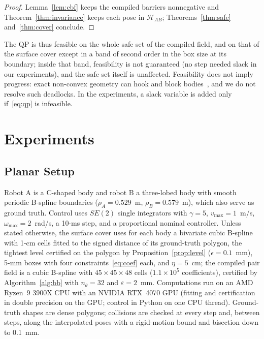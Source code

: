 \documentclass[journal]{IEEEtran}
\theoremstyle{definition}
\begin{document}
\begin{proof}
Lemma~\ref{lem:cbf} keeps the compiled barriers nonnegative and Theorem~\ref{thm:invariance} keeps each
pose in $\mathcal H_{AB}$; Theorems~\ref{thm:safe} and~\ref{thm:cover} conclude.
\end{proof}
The QP is thus feasible on the whole safe set of the compiled field, and on that of the surface cover
except in a band of second order in the box size at its boundary; inside that band, feasibility is not
guaranteed (no step needed slack in our experiments), and the safe set itself is unaffected.
Feasibility does not imply progress: exact non-convex geometry can hook and block
bodies~\cite{reis2020undesirable}, and we do not resolve such deadlocks. In the experiments, a slack
variable is added only if~\eqref{eq:qp} is infeasible.

\section{Experiments}\label{sec:exp}

\subsection{Planar Setup}
Robot A is a C-shaped body and robot B a three-lobed body with smooth periodic B-spline boundaries
($\rho_A=0.529$~m, $\rho_B=0.579$~m), which also serve as ground truth. Control uses $SE(2)$ single
integrators with $\gamma=5$, $v_{\max}=1$~m/s, $\omega_{\max}=2$~rad/s, a 10-ms step, and a
proportional nominal controller. Unless stated otherwise, the surface cover uses for each body a
bivariate cubic B-spline with 1-cm cells fitted to the signed distance of its ground-truth polygon,
the tightest level certified on the polygon by Proposition~\ref{prop:level} ($\epsilon=0.1$~mm),
5-mm boxes with four constraints~\eqref{eq:coef} each, and $\eta=5$~cm; the compiled pair field is a cubic B-spline with $45\times45\times48$
cells ($1.1\times10^5$ coefficients), certified by Algorithm~\ref{alg:bb} with $n_\theta=32$ and
$\varepsilon=2$~mm. Computations run on an AMD Ryzen~9 3900X CPU with an NVIDIA RTX~4070 GPU
(fitting and certification in double precision on the GPU; control in Python on one CPU thread).
Ground-truth shapes are dense polygons; collisions are checked at every step and, between
steps, along the interpolated poses with a rigid-motion bound and bisection down to 0.1~mm.
\end{document}
